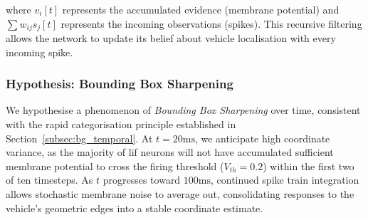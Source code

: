 where $v_i[t]$ represents the accumulated evidence (membrane potential) and $\sum w_{ij}s_j[t]$ represents the incoming observations (spikes). 
This recursive filtering allows the network to update its belief about vehicle localisation with every incoming spike.

\subsubsection{Hypothesis: Bounding Box Sharpening}
We hypothesise a phenomenon of \textit{Bounding Box Sharpening} over time,
consistent with the rapid categorisation principle established in
Section~\ref{subsec:bg_temporal}.
At $t = 20\text{ms}$, we anticipate high coordinate variance, as the majority
of \gls{lif} neurons will not have accumulated sufficient membrane potential to
cross the firing threshold ($V_{th} = 0.2$) within the first two of ten
timesteps. As $t$ progresses toward $100\text{ms}$, continued spike train
integration allows stochastic membrane noise to average out, consolidating
responses to the vehicle's geometric edges into a stable coordinate estimate.